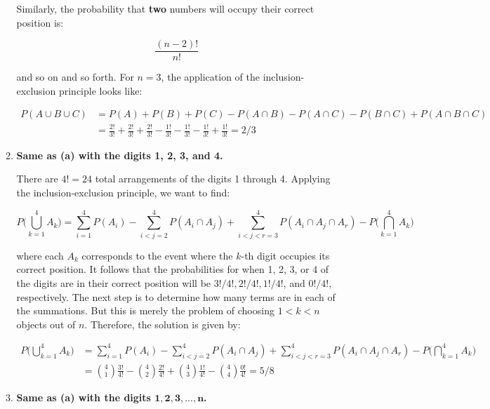 \documentclass[10pt, oneside]{article}   	%
\theoremstyle{definition}
\begin{document}
\begin{enumerate}[label=2.\arabic*]
\begin{enumerate}
	Similarly, the probability that \textbf{two} numbers will occupy their correct position is:
	
	\[ \frac{(n-2)!}{n!} \]
	
	and so on and so forth. For $n = 3$, the application of the inclusion-exclusion principle looks like:
	
	\begin{align*}
	P(A \cup B \cup C) &= P(A) + P(B) + P(C) - P(A \cap B) - P(A \cap C) - P(B \cap C) + P(A \cap B \cap C) \\
	&= \frac{2!}{3!} +  \frac{2!}{3!} +  \frac{2!}{3!} - \frac{1!}{3!} -  \frac{1!}{3!} -  \frac{1!}{3!} +  \frac{1!}{3!} = \boxed{2/3}
	\end{align*}
	\item \begin{tcolorbox}[
  colback=Cerulean!5!white,
  colframe=Cerulean!75!black] \textbf{Same as (a) with the digits 1, 2, 3, and 4.}
	\end{tcolorbox}
	
	There are $4! = 24$ total arrangements of the digits 1 through 4. Applying the inclusion-exclusion principle, we want to find:
	
	\[ P\Bigg( \bigcup^4_{k=1} A_k \Bigg) = \sum_{i = 1}^4 P(A_i) - \sum_{i < j = 2}^4 P(A_i \cap A_j) + \sum_{i < j < r = 3}^4 P(A_i \cap A_j \cap A_r) - P \Bigg( \bigcap^4_{k=1} A_k \Bigg) \]
	
	where each $A_k$ corresponds to the event where the $k$-th digit occupies its correct position. It follows that the probabilities for when 1, 2, 3, or 4 of the digits are in their correct position will be $3! / 4!, 2! / 4!, 1! / 4!$, and $0! / 4!$, respectively. The next step is to determine how many terms are in each of the summations. But this is merely the problem of choosing $1 < k < n$ objects out of $n$. Therefore, the solution is given by:
	
	\begin{align*}
	P\Bigg( \bigcup^4_{k=1} A_k \Bigg) &= \sum_{i = 1}^4 P(A_i) - \sum_{i < j = 2}^4 P(A_i \cap A_j) + \sum_{i < j < r = 3}^4 P(A_i \cap A_j \cap A_r) - P \Bigg( \bigcap^4_{k=1} A_k \Bigg)  \\
	&= \binom {4}{1} \frac{3!}{4!} - \binom {4}{2} \frac{2!}{4!} + \binom{4}{3} \frac{1!}{4!} - \binom{4}{4} \frac{0!}{4!} = \boxed{5/8}
	\end{align*}

	\item  \begin{tcolorbox}[
  colback=Cerulean!5!white,
  colframe=Cerulean!75!black]
  \textbf{Same as (a) with the digits $\bm{1, 2, 3, ..., n}$. }
	\end{tcolorbox}
	

\end{enumerate}
\end{enumerate}
\end{document}
